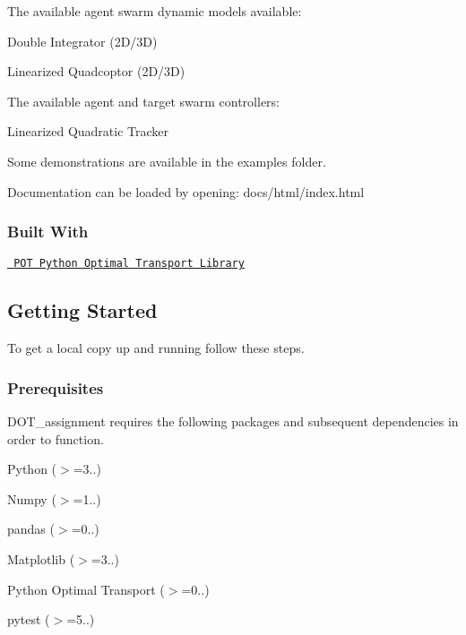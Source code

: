The available agent swarm dynamic models available\+:
\begin{DoxyItemize}
\item Double Integrator (2D/3D)
\item Linearized Quadcoptor (2D/3D)
\end{DoxyItemize}

The available agent and target swarm controllers\+:
\begin{DoxyItemize}
\item Linearized Quadratic Tracker
\end{DoxyItemize}

Some demonstrations are available in the examples folder.

Documentation can be loaded by opening\+: docs/html/index.\+html

\subsubsection*{Built With}


\begin{DoxyItemize}
\item \href{https://github.com/rflamary/POT}{\texttt{ P\+OT Python Optimal Transport Library}}
\end{DoxyItemize}

\subsection*{Getting Started}

To get a local copy up and running follow these steps.

\subsubsection*{Prerequisites}

D\+O\+T\+\_\+assignment requires the following packages and subsequent dependencies in order to function.


\begin{DoxyItemize}
\item Python ($>$=3..)
\item Numpy ($>$=1..)
\item pandas ($>$=0..)
\item Matplotlib ($>$=3..)
\item Python Optimal Transport ($>$=0..) 
\begin{DoxyCode}{0}
\end{DoxyCode}

\item pytest ($>$=5..) 
\begin{DoxyCode}{0}
\end{DoxyCode}

\end{DoxyItemize}


